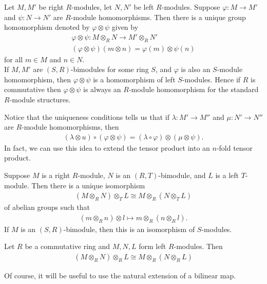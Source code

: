 \documentclass{memoir}
\begin{document}
\begin{thm}
	Let \(M, M'\) be right \(R\)-modules, let \(N,N'\) be left \(R\)-modules. Suppose \(\varphi :M \to M'\) and \(\psi : N \to N'\) are \(R\)-module homomorphisms. Then there is a unique group homomorphism denoted by \(\varphi  \otimes \psi \) given by
	\begin{align*}
		\varphi \otimes \psi : M \otimes_R N \to M' \otimes_R N'\\
		(\varphi \otimes \psi )(m \otimes n) = \varphi (m) \otimes \psi (n)
	\end{align*}
	for all \(m \in M\) and \(n \in N\).\\

	If \(M,M'\) are \((S,R)\)-bimodules for some ring \(S\), and \(\varphi \) is also an \(S\)-module homomorphism, then \(\varphi \otimes \psi \) is a homomorphism of left \(S\)-modules. Hence if \(R\) is commutative then \(\varphi \otimes \psi \) is always an \(R\)-module homomorphism for the standard \(R\)-module structures.
\end{thm}
Notice that the uniqueness conditions tells us that if \(\lambda :M' \to M''\) and \(\mu : N' \to N''\) are \(R\)-module homomorphisms, then
\begin{align*}
	(\lambda \otimes u ) \circ (\varphi  \otimes \psi ) = (\lambda \circ \varphi ) \otimes (\mu  \otimes \psi ).
\end{align*}
In fact, we can use this idea to extend the tensor product into an \(n\)-fold tensor product.

\begin{thm}
	Suppose \(M\) is a right \(R\)-module, \(N\) is an \((R,T)\)-bimodule, and \(L\) is a left \(T\)-module. Then there is a unique isomorphism
	\begin{align*}
		(M \otimes_R N) \otimes_T L \cong M \otimes_R (N \otimes_T L)
	\end{align*}
	of abelian groups such that
	\begin{align*}
		(m \otimes_R n) \otimes l \mapsto m \otimes_R(n \otimes_R l).
	\end{align*}
	If \(M\) is an \((S,R)\)-bimodule, then this is an isomorphism of \(S\)-modules.
\end{thm}

\begin{cor}
	Let \(R\) be a commutative ring and \(M,N,L\) form left \(R\)-modules. Then
	\begin{align*}
		(M \otimes_R N) \otimes_R L \cong M \otimes_R(N \otimes_R L)
	\end{align*}
\end{cor}
Of course, it will be useful to use the natural extension of a bilinear map.
\end{document}

